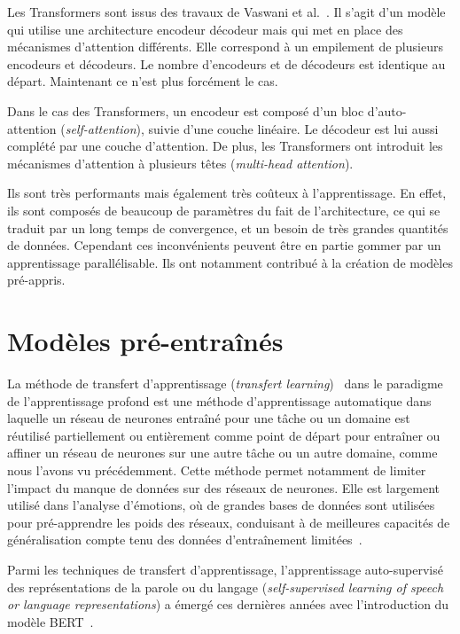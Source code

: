 Les Transformers sont issus des travaux de Vaswani et al.~\cite{Vaswani2017}. Il s’agit d’un modèle qui utilise une architecture encodeur décodeur mais qui met en place des mécanismes d’attention différents. Elle correspond à un empilement de plusieurs encodeurs et décodeurs. Le nombre d’encodeurs et de décodeurs est identique au départ. Maintenant ce n'est plus forcément le cas.

Dans le cas des Transformers, un encodeur est composé d’un bloc d’auto-attention (\textit{self-attention}), suivie d’une couche linéaire. Le décodeur est lui aussi complété par une couche d’attention. De plus, les Transformers ont introduit les mécanismes d’attention à plusieurs têtes (\textit{multi-head attention}).

Ils sont très performants mais également très coûteux à l'apprentissage. En effet, ils sont composés de beaucoup de paramètres du fait de l'architecture, ce qui se traduit par un long temps de convergence, et un besoin de très grandes quantités de données. Cependant ces inconvénients peuvent être en partie gommer par un apprentissage parallélisable. Ils ont notamment contribué à la création de modèles pré-appris.


\section{Modèles pré-entraînés}

La méthode de transfert d'apprentissage (\textit{transfert learning})~\cite{Goodfellow2016} dans le paradigme de l'apprentissage profond est une méthode d'apprentissage automatique dans laquelle un réseau de neurones entraîné pour une tâche ou un domaine est réutilisé partiellement ou entièrement comme point de départ pour entraîner ou affiner un réseau de neurones sur une autre tâche ou un autre domaine, comme nous l'avons vu précédemment. Cette méthode permet notamment de limiter l'impact du manque de données sur des réseaux de neurones.
Elle est largement utilisé dans l'analyse d'émotions, où de grandes bases de données sont utilisées pour pré-apprendre les poids des réseaux, conduisant à de meilleures capacités de généralisation compte tenu des données d’entraînement limitées~\cite{Dong2018}.

Parmi les techniques de transfert d'apprentissage, l'apprentissage auto-supervisé des représentations de la parole ou du langage (\textit{self-supervised learning of speech or language representations}) a émergé ces dernières années avec l'introduction du modèle BERT~\cite{Devlin2019}.

